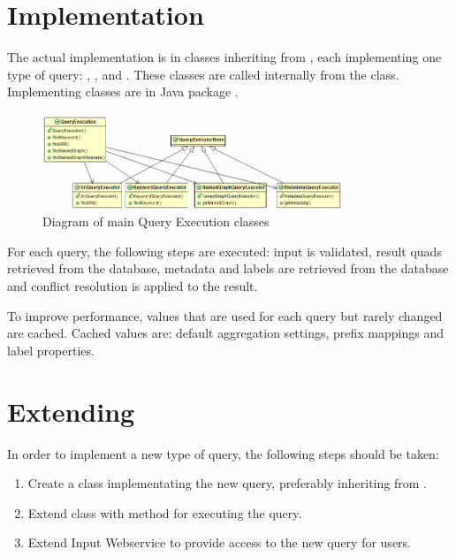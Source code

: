 \section{Implementation}
The actual implementation is in classes inheriting from , each implementing one type of query: , ,  and . These classes are called internally from the  class. Implementing classes are in Java package .

\begin{figure}[htb]
    \centering
    \includegraphics[width=0.8\textwidth]{images/dia-qe.png}
    \caption{Diagram of main Query Execution classes}
	\label{fig:qeClasses}
\end{figure}

For each query, the following steps are executed: input is validated, result quads retrieved from the database, metadata and labels are retrieved from the database and conflict resolution is applied to the result.

To improve performance, values that are used for each query but rarely changed are cached. Cached values are: default aggregation settings, prefix mappings and label properties.

\section{Extending}
\label{sec:qeExtending}
In order to implement a new type of query, the following steps should be taken:

\begin{enumerate}
	\item Create a class implementating the new query, preferably inheriting from .
	\item Extend  class with method for executing the query.
	\item Extend Input Webservice to provide access to the new query for users.
\end{enumerate}

